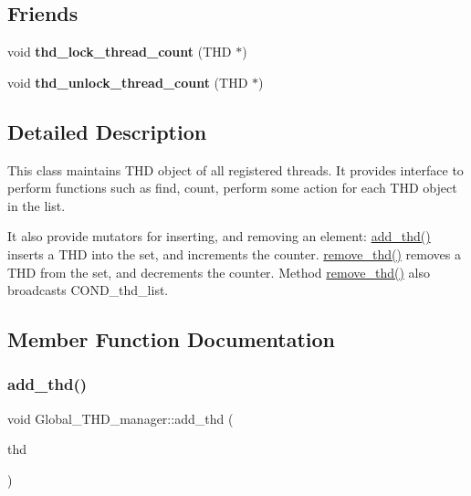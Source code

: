 \subsection*{Friends}
\begin{DoxyCompactItemize}
\item 
\mbox{\label{classGlobal__THD__manager_ad065a546682f049bc77783f533d4699c}} 
void {\bfseries thd\+\_\+lock\+\_\+thread\+\_\+count} (T\+HD $\ast$)
\item 
\mbox{\label{classGlobal__THD__manager_add05e7a76f816b9843e8ecda6726f9d5}} 
void {\bfseries thd\+\_\+unlock\+\_\+thread\+\_\+count} (T\+HD $\ast$)
\end{DoxyCompactItemize}


\subsection{Detailed Description}
This class maintains T\+HD object of all registered threads. It provides interface to perform functions such as find, count, perform some action for each T\+HD object in the list.

It also provide mutators for inserting, and removing an element\+: \mbox{\hyperlink{classGlobal__THD__manager_a0b2f6b235db53984b7c1ec63ee4a0dd9}{add\+\_\+thd()}} inserts a T\+HD into the set, and increments the counter. \mbox{\hyperlink{classGlobal__THD__manager_acb2067c4549d412ac402e6941930f793}{remove\+\_\+thd()}} removes a T\+HD from the set, and decrements the counter. Method \mbox{\hyperlink{classGlobal__THD__manager_acb2067c4549d412ac402e6941930f793}{remove\+\_\+thd()}} also broadcasts C\+O\+N\+D\+\_\+thd\+\_\+list. 

\subsection{Member Function Documentation}
\mbox{\label{classGlobal__THD__manager_a0b2f6b235db53984b7c1ec63ee4a0dd9}} 
\subsubsection{\texorpdfstring{add\+\_\+thd()}{add\_thd()}}
{\footnotesize\ttfamily void Global\+\_\+\+T\+H\+D\+\_\+manager\+::add\+\_\+thd (\begin{DoxyParamCaption}\item[{T\+HD $\ast$}]{thd }\end{DoxyParamCaption})}

